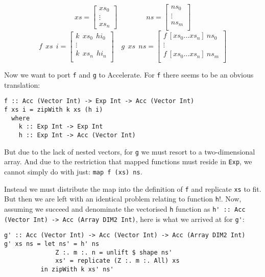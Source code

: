 \[
xs =
\begin{bmatrix}
  xs_0 \\
\vdots \\
xs_n
\end{bmatrix}
\qquad\qquad
ns =
\begin{bmatrix}
  ns_0 \\
\vdots \\
ns_m \\
\end{bmatrix}
\]
\[
f\ \ xs\ \ i =
\begin{bmatrix}
  k\ \ xs_0\ \ hi_0 \\
\vdots \\
  k\ \ xs_n\ \ hi_n \\
\end{bmatrix}
\quad
g\ \ xs\ \ ns =
\begin{bmatrix}
  f\ \left[xs_0 \ldots xs_n\right]\ ns_0 \\
\vdots \\
f\ \left[xs_0 \ldots xs_n\right]\ ns_m \\
\end{bmatrix}
\]

Now we want to port \texttt{f} and \texttt{g} to Accelerate.
For \texttt{f} there seems to be an obvious translation:

\begin{verbatim}
f :: Acc (Vector Int) -> Exp Int -> Acc (Vector Int)
f xs i = zipWith k xs (h i)
  where
    k :: Exp Int -> Exp Int
    h :: Exp Int -> Acc (Vector Int)
\end{verbatim}

But due to the lack of nested vectors, for \texttt{g} we must resort to a two-dimensional
array. And due to the restriction that mapped functions must reside in
\texttt{Exp}, we cannot simply do with just: \verb|map f (xs) ns|.

Instead we must distribute the map into the definition of \texttt{f} and
replicate \texttt{xs} to fit. But then we are left with an identical problem
relating to function \texttt{h}!. Now, assuming we succeed and denominate the
vectorised \texttt{h} function as
\verb|h' :: Acc (Vector Int) -> Acc (Array DIM2 Int)|,
here is what we arrived at for \verb|g'|:

\begin{verbatim}
g' :: Acc (Vector Int) -> Acc (Vector Int) -> Acc (Array DIM2 Int)
g' xs ns = let ns' = h' ns
              Z :. m :. n = unlift $ shape ns'
              xs' = replicate (Z :. m :. All) xs
          in zipWith k xs' ns'
\end{verbatim}

